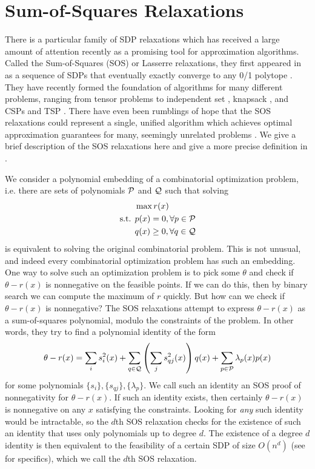 \section{Sum-of-Squares Relaxations}
There is a particular family of SDP relaxations which has received a large amount of attention recently as a promising tool for approximation algorithms. Called the Sum-of-Squares (SOS) or Lasserre relaxations, they first appeared in \cite{Las01} as a sequence of SDPs that eventually exactly converge to any 0/1 polytope . They have recently formed the foundation of algorithms for many different problems, ranging from tensor problems \cite{TS15,PS17,BKS15,HSS15} to independent set \cite{CS08}, knapsack \cite{KMN10}, and \textsc{CSP}s and \textsc{TSP} \cite{LRST14,RT12}. There have even been rumblings  of hope that the SOS relaxations could represent a single, unified algorithm which achieves optimal approximation guarantees for many, seemingly unrelated problems \cite{BS14}. We give a brief description of the SOS relaxations here and give a more precise definition in .

We consider a polynomial embedding of a combinatorial optimization problem, i.e. there are sets of polynomials $\mathcal P$ and $\mathcal Q$ such that solving
\begin{align*}
&\max r(x) \\
\text{s.t. } &p(x) = 0, \forall p \in \mathcal P \\
&q(x) \geq 0, \forall q \in \mathcal Q
\end{align*}
is equivalent to solving the original combinatorial problem. This is not unusual, and indeed every combinatorial optimization problem has such an embedding. One way to solve such an optimization problem is to pick some $\theta$ and check if $\theta - r(x)$ is nonnegative on the feasible points. If we can do this, then by binary search we can compute the maximum of $r$ quickly. But how can we check if $\theta - r(x)$ is nonnegative? The SOS relaxations attempt to express $\theta - r(x)$ as a sum-of-squares polynomial, modulo the constraints of the problem. In other words, they try to find a polynomial identity of the form
\[\theta - r(x) = \sum_i s_i^2(x) + \sum_{q \in \mathcal Q} \left(\sum_j s_{qj}^2(x)\right)q(x) + \sum_{p\in\mathcal P} \lambda_p(x)p(x)\label{eq:intro_sos_proof}\]
for some polynomials $\{s_i\}, \{s_{qj}\}, \{\lambda_p\}$.
We call such an identity an SOS proof of nonnegativity for $\theta - r(x)$.
If such an identity exists, then certainly $\theta - r(x)$ is nonnegative on any $x$ satisfying the constraints. Looking for \emph{any} such identity would be intractable, so the $d$th SOS relaxation checks for the existence of such an identity that uses only polynomials up to degree $d$. The existence of a degree $d$ identity is then equivalent to the feasibility of a certain SDP of size $O(n^d)$ (see  for specifics), which we call the $d$th SOS relaxation.

